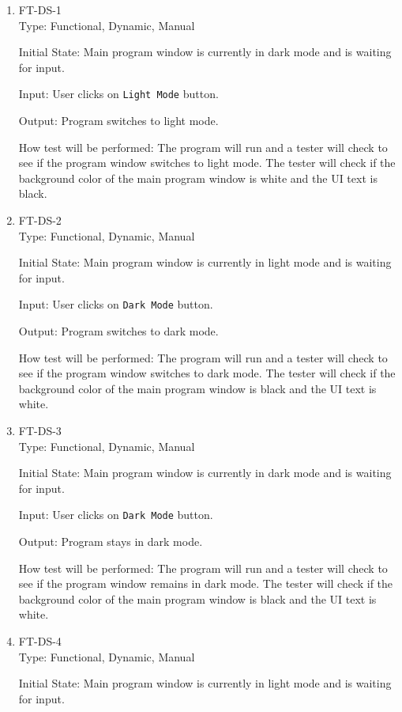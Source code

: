 \documentclass[12pt, titlepage]{article}
\begin{document}
\begin{enumerate}

\item{FT-DS-1}\\
Type: Functional, Dynamic, Manual

Initial State: Main program window is currently in dark mode and is waiting for input. %

Input: User clicks on \texttt{Light Mode} button.

Output: Program switches to light mode.

How test will be performed: The program will run and a tester will check to see if the program window switches to light mode. The tester will check if the background color of the main program window is white and the UI text is black.

\item{FT-DS-2}\\
Type: Functional, Dynamic, Manual

Initial State: Main program window is currently in light mode and is waiting for input. %

Input: User clicks on \texttt{Dark Mode} button.

Output: Program switches to dark mode.

How test will be performed: The program will run and a tester will check to see if the program window switches to dark mode. The tester will check if the background color of the main program window is black and the UI text is white.

\item{FT-DS-3}\\
Type: Functional, Dynamic, Manual

Initial State: Main program window is currently in dark mode and is waiting for input. %

Input: User clicks on \texttt{Dark Mode} button.

Output: Program stays in dark mode.

How test will be performed: The program will run and a tester will check to see if the program window remains in dark mode. The tester will check if the background color of the main program window is black and the UI text is white.

\item{FT-DS-4}\\
Type: Functional, Dynamic, Manual

Initial State: Main program window is currently in light mode and is waiting for input. %


\end{enumerate}
\end{document}
